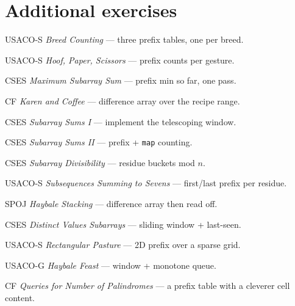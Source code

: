 \section{Additional exercises}
\begin{exercise}[easy]
USACO-S \emph{Breed Counting} --- three prefix tables, one per breed.
\end{exercise}
\begin{exercise}[easy]
USACO-S \emph{Hoof, Paper, Scissors} --- prefix counts per gesture.
\end{exercise}
\begin{exercise}[easy]
CSES \emph{Maximum Subarray Sum} --- prefix min so far, one pass.
\end{exercise}
\begin{exercise}[easy]
CF \emph{Karen and Coffee} --- difference array over the recipe range.
\end{exercise}
\begin{exercise}[medium]
CSES \emph{Subarray Sums I} --- implement the telescoping window.
\end{exercise}
\begin{exercise}[medium]
CSES \emph{Subarray Sums II} --- prefix + \texttt{map} counting.
\end{exercise}
\begin{exercise}[medium]
CSES \emph{Subarray Divisibility} --- residue buckets mod $n$.
\end{exercise}
\begin{exercise}[medium]
USACO-S \emph{Subsequences Summing to Sevens} --- first/last prefix
per residue.
\end{exercise}
\begin{exercise}[medium]
SPOJ \emph{Haybale Stacking} --- difference array then read off.
\end{exercise}
\begin{exercise}[medium]
CSES \emph{Distinct Values Subarrays} --- sliding window + last-seen.
\end{exercise}
\begin{exercise}[hard]
USACO-S \emph{Rectangular Pasture} --- 2D prefix over a sparse grid.
\end{exercise}
\begin{exercise}[hard]
USACO-G \emph{Haybale Feast} --- window + monotone queue.
\end{exercise}
\begin{exercise}[hard]
CF \emph{Queries for Number of Palindromes} --- a prefix table with a
cleverer cell content.
\end{exercise}

